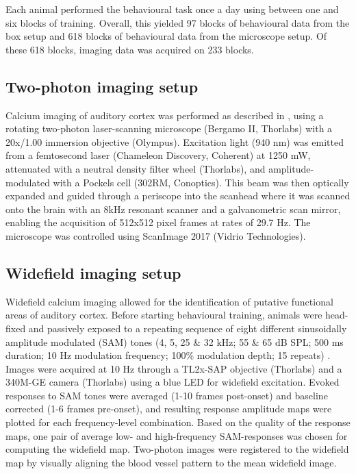 \documentclass[]{report}
\theoremstyle{definition}
\theoremstyle{definition}
\theoremstyle{definition}
\theoremstyle{remark}
\begin{document}
Each animal performed the behavioural task once a day using between one
and six blocks of training. Overall, this yielded 97 blocks of
behavioural data from the box setup and 618 blocks of behavioural data
from the microscope setup. Of these 618 blocks, imaging data was
acquired on 233 blocks.

\hypertarget{two-photon-imaging-setup}{%
\subsection{Two-photon imaging setup}\label{two-photon-imaging-setup}}

Calcium imaging of auditory cortex was performed as described in
\citet{weissenberger2019licks}, using a rotating two-photon
laser-scanning microscope (Bergamo II, Thorlabs) with a 20x/1.00
immersion objective (Olympus). Excitation light (940 nm) was emitted
from a femtosecond laser (Chameleon Discovery, Coherent) at 1250 mW,
attenuated with a neutral density filter wheel (Thorlabs), and
amplitude-modulated with a Pockels cell (302RM, Conoptics). This beam
was then optically expanded and guided through a periscope into the
scanhead where it was scanned onto the brain with an 8kHz resonant
scanner and a galvanometric scan mirror, enabling the acquisition of
512x512 pixel frames at rates of 29.7 Hz. The microscope was controlled
using ScanImage 2017 (Vidrio Technologies).

\hypertarget{widefield-imaging-setup}{%
\subsection{Widefield imaging setup}\label{widefield-imaging-setup}}

Widefield calcium imaging allowed for the identification of putative
functional areas of auditory cortex. Before starting behavioural
training, animals were head-fixed and passively exposed to a repeating
sequence of eight different sinusoidally amplitude modulated (SAM) tones
(4, 5, 25 \& 32 kHz; 55 \& 65 dB SPL; 500 ms duration; 10 Hz modulation
frequency; 100\% modulation depth; 15 repeats) . Images were acquired at
10 Hz through a TL2x-SAP objective (Thorlabs) and a 340M-GE camera
(Thorlabs) using a blue LED for widefield excitation. Evoked responses
to SAM tones were averaged (1-10 frames post-onset) and baseline
corrected (1-6 frames pre-onset), and resulting response amplitude maps
were plotted for each frequency-level combination. Based on the quality
of the response maps, one pair of average low- and high-frequency
SAM-responses was chosen for computing the widefield map. Two-photon
images were registered to the widefield map by visually aligning the
blood vessel pattern to the mean widefield image.
\end{document}
